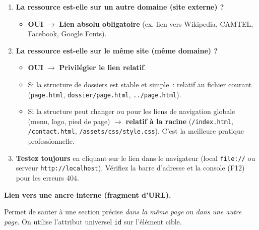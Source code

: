 \documentclass[11pt]{article}
\begin{document}
\begin{methode}
\begin{enumerate}
    \item \textbf{La ressource est-elle sur un autre domaine (site externe) ?}
        \begin{itemize}
            \item \textbf{OUI} $\to$ \textbf{Lien absolu obligatoire} (ex. lien vers Wikipedia, CAMTEL, Facebook, Google Fonts).
        \end{itemize}
    \item \textbf{La ressource est-elle sur le même site (même domaine) ?}
        \begin{itemize}
            \item \textbf{OUI} $\to$ \textbf{Privilégier le lien relatif}.
            \item Si la structure de dossiers est stable et simple~: relatif au fichier courant (\texttt{page.html}, \texttt{dossier/page.html}, \texttt{../page.html}).
            \item Si la structure peut changer ou pour les liens de navigation globale (menu, logo, pied de page) $\to$ \textbf{relatif à la racine} (\texttt{/index.html}, \texttt{/contact.html}, \texttt{/assets/css/style.css}). C'est la meilleure pratique professionnelle.
        \end{itemize}
    \item \textbf{Testez toujours} en cliquant sur le lien dans le navigateur (local \texttt{file://} ou serveur \texttt{http://localhost}). Vérifiez la barre d'adresse et la console (F12) pour les erreurs 404.
\end{enumerate}
\end{methode}

\textbf{Lien vers une ancre interne (fragment d'URL).}\par
Permet de sauter à une section précise \emph{dans la même page} ou \emph{dans une autre page}. On utilise l'attribut universel \texttt{id} sur l'élément cible.
\end{document}

